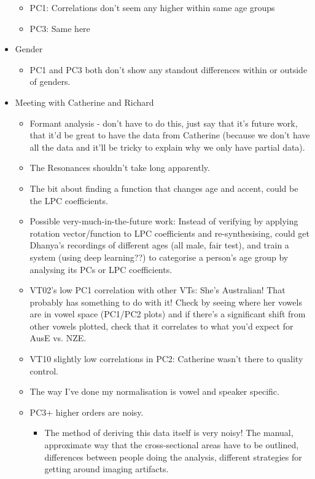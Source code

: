 \documentclass{article}
\begin{document}
\begin{itemize}
\begin{itemize}
        \item PC1: Correlations don't seem any higher within same age groups
        \item PC3: Same here
    \end{itemize}
    \item Gender
    \begin{itemize}
        \item PC1 and PC3 both don't show any standout differences within or outside of genders.
    \end{itemize}
    \item Meeting with Catherine and Richard
    \begin{itemize}
        \item Formant analysis - don't have to do this, just say that it's future work, that it'd be great to have the data from Catherine (because we don't have all the data and it'll be tricky to explain why we only have partial data).
        \item The Resonances shouldn't take long apparently.
        \item The bit about finding a function that changes age and accent, could be the LPC coefficients.
        \item Possible very-much-in-the-future work: Instead of verifying by applying rotation vector/function to LPC coefficients and re-synthesising, could get Dhanya's recordings of different ages (all male, fair test), and train a system (using deep learning??) to categorise a person's age group by analysing its PCs or LPC coefficients.
        \item VT02's low PC1 correlation with other VTs: She's Australian! That probably has something to do with it! Check by seeing where her vowels are in vowel space (PC1/PC2 plots) and if there's a significant shift from other vowels plotted, check that it correlates to what you'd expect for AusE vs. NZE.
        \item VT10 slightly low correlations in PC2: Catherine wasn't there to quality control.
        \item The way I've done my normalisation is vowel and speaker specific.
        \item PC3+ higher orders are noisy.
        \begin{itemize}
            \item The method of deriving this data itself is very noisy! The manual, approximate way that the cross-sectional areas have to be outlined, differences between people doing the analysis, different strategies for getting around imaging artifacts.

\end{itemize}
\end{itemize}
\end{itemize}
\end{document}
